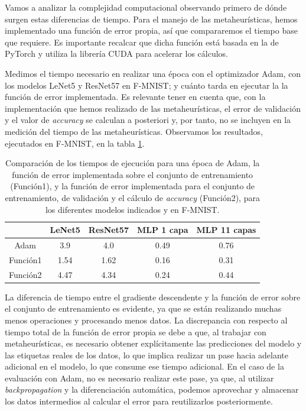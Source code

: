 Vamos a analizar la complejidad computacional observando primero de dónde surgen estas diferencias de tiempo. Para el manejo de las metaheurísticas, hemos implementado una función de error propia, así que compararemos el tiempo base que requiere. Es importante recalcar que dicha función está basada en la de PyTorch y utiliza la librería CUDA para acelerar los cálculos.

Medimos el tiempo necesario en realizar una época con el optimizador Adam, con los modelos LeNet5 y ResNet57 en F-MNIST; y cuánto tarda en ejecutar la la función de error implementada. Es relevante tener en cuenta que, con la implementación que hemos realizado de las metaheurísticas, el error de validación y el valor de \textit{accuracy} se calculan a posteriori y, por tanto, no se incluyen en la medición del tiempo de las metaheurísticas. Observamos los resultados, ejecutados en F-MNIST, en la tabla \ref{tab:base_time}.

\begin{table}[]
\centering
\begin{tabular}{c|c|c|c|c|}
\cline{2-5}
                                                                     & LeNet5 & ResNet57 & MLP 1 capa & MLP 11 capas \\ \hline
\multicolumn{1}{|c|}{Adam}                                           & 3.9    & 4.0      & 0.49       & 0.76         \\ \hline
\multicolumn{1}{|c|}{Función1}              & 1.54   & 1.62     & 0.16       & 0.31         \\ \hline
\multicolumn{1}{|c|}{Función2} & 4.47   & 4.34     & 0.24       & 0.44         \\ \hline
\end{tabular}
\caption{Comparación de los tiempos de ejecución para una época de Adam, la función de error implementada sobre el conjunto de entrenamiento (Función1), y la función de error implementada para el conjunto de entrenamiento, de validación y el cálculo de \textit{accuracy} (Función2), para los diferentes modelos indicados y en F-MNIST.}
\label{tab:base_time}
\end{table}


La diferencia de tiempo entre el gradiente descendente y la función de error sobre el conjunto de entrenamiento es evidente, ya que se están realizando muchas menos operaciones y procesando menos datos. La discrepancia con respecto al tiempo total de la función de error propia se debe a que, al trabajar con metaheurísticas, es necesario obtener explícitamente las predicciones del modelo y las etiquetas reales de los datos, lo que implica realizar un pase hacia adelante adicional en el modelo, lo que consume ese tiempo adicional. En el caso de la evaluación con Adam, no es necesario realizar este pase, ya que, al utilizar \textit{backpropagation} y la diferenciación automática, podemos aprovechar y almacenar los datos intermedios al calcular el error para reutilizarlos posteriormente.

